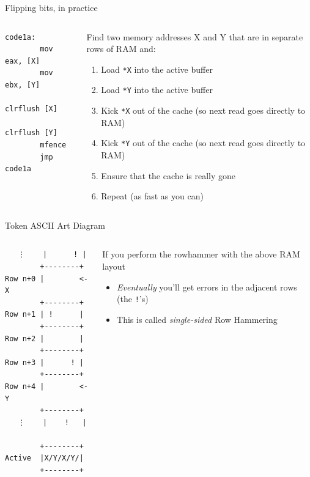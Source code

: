 \documentclass[9pt,aspectratio=169]{beamer}
\begin{document}
\begin{frame}[label={sec:org6a8ad5d},fragile]{Flipping bits, in practice}
 \begin{columns}
\begin{column}[t]{0.49\columnwidth}
\begin{verbatim}
code1a:
        mov eax, [X]
        mov ebx, [Y]
        clrflush [X]
        clrflush [Y]
        mfence
        jmp code1a
\end{verbatim}
\end{column}

\begin{column}[t]{0.49\columnwidth}
Find two memory addresses X and Y that are in separate rows of RAM and:
\begin{enumerate}
\item Load \texttt{*X} into the active buffer
\item Load \texttt{*Y} into the active buffer
\item Kick \texttt{*X} out of the cache (so next read goes directly to RAM)
\item Kick \texttt{*Y} out of the cache (so next read goes directly to RAM)
\item Ensure that the cache is really gone
\item Repeat (as fast as you can)
\end{enumerate}
\end{column}
\end{columns}
\end{frame}

\begin{frame}[label={sec:org621a53a},fragile]{Token ASCII Art Diagram}
 \begin{columns}
\begin{column}[t]{0.2\columnwidth}
\begin{verbatim}
   ⋮    |      ! |
        +--------+
Row n+0 |        <- X
        +--------+
Row n+1 | !      |
        +--------+
Row n+2 |        | 
        +--------+
Row n+3 |      ! | 
        +--------+
Row n+4 |        <- Y
        +--------+
   ⋮    |    !   |

        +--------+
Active  |X/Y/X/Y/|
        +--------+
\end{verbatim}
\end{column}

\begin{column}[t]{0.79\columnwidth}
If you perform the rowhammer with the above RAM layout
\begin{itemize}
\item \emph{Eventually} you'll get errors in the adjacent rows (the \texttt{!}'s)
\item This is called \emph{single-sided} Row Hammering
\end{itemize}
\end{column}
\end{columns}
\end{frame}
\end{document}
